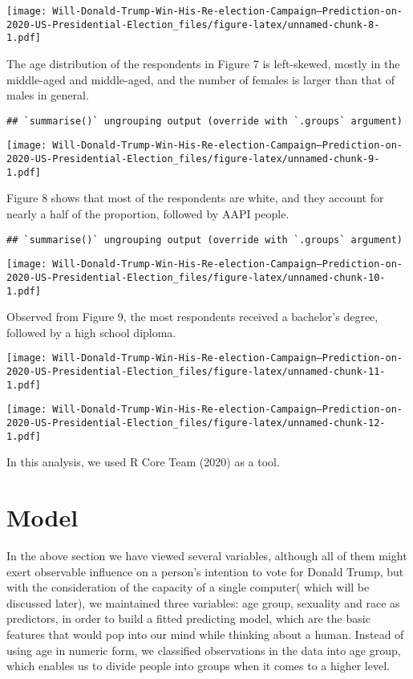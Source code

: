 \documentclass[
]{article}
\begin{document}
\texttt{[image: Will-Donald-Trump-Win-His-Re-election-Campaign--Prediction-on-2020-US-Presidential-Election\_files/figure-latex/unnamed-chunk-8-1.pdf]}

The age distribution of the respondents in Figure 7 is left-skewed,
mostly in the middle-aged and middle-aged, and the number of females is
larger than that of males in general.

\begin{verbatim}
## `summarise()` ungrouping output (override with `.groups` argument)
\end{verbatim}

\texttt{[image: Will-Donald-Trump-Win-His-Re-election-Campaign--Prediction-on-2020-US-Presidential-Election\_files/figure-latex/unnamed-chunk-9-1.pdf]}

Figure 8 shows that most of the respondents are white, and they account
for nearly a half of the proportion, followed by AAPI people.

\begin{verbatim}
## `summarise()` ungrouping output (override with `.groups` argument)
\end{verbatim}

\texttt{[image: Will-Donald-Trump-Win-His-Re-election-Campaign--Prediction-on-2020-US-Presidential-Election\_files/figure-latex/unnamed-chunk-10-1.pdf]}

Observed from Figure 9, the most respondents received a bachelor's
degree, followed by a high school diploma.

\texttt{[image: Will-Donald-Trump-Win-His-Re-election-Campaign--Prediction-on-2020-US-Presidential-Election\_files/figure-latex/unnamed-chunk-11-1.pdf]}

\texttt{[image: Will-Donald-Trump-Win-His-Re-election-Campaign--Prediction-on-2020-US-Presidential-Election\_files/figure-latex/unnamed-chunk-12-1.pdf]}

In this analysis, we used R Core Team (2020) as a tool.

\hypertarget{model}{%
\section{Model}\label{model}}

In the above section we have viewed several variables, although all of
them might exert observable influence on a person's intention to vote
for Donald Trump, but with the consideration of the capacity of a single
computer( which will be discussed later), we maintained three variables:
age group, sexuality and race as predictors, in order to build a fitted
predicting model, which are the basic features that would pop into our
mind while thinking about a human. Instead of using age in numeric form,
we classified observations in the data into age group, which enables us
to divide people into groups when it comes to a higher level.
\end{document}
